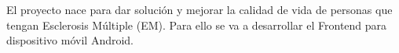 
El proyecto nace para dar solución y mejorar la calidad de vida de personas que tengan Esclerosis Múltiple (EM). Para ello se va a desarrollar el Frontend para dispositivo móvil Android. 
